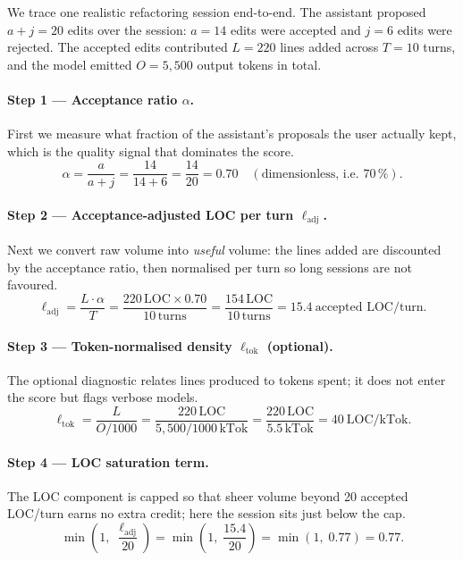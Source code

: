 \documentclass[11pt,a4paper]{article}
\begin{document}
We trace one realistic refactoring session end-to-end.  The assistant
proposed $a + j = 20$ edits over the session: $a = 14$ edits were accepted
and $j = 6$ edits were rejected.  The accepted edits contributed
$L = 220$ lines added across $T = 10$ turns, and the model emitted
$O = 5{,}500$ output tokens in total.

\paragraph{Step 1 --- Acceptance ratio $\alpha$.}
First we measure what fraction of the assistant's proposals the user
actually kept, which is the quality signal that dominates the score.
\[
  \alpha = \frac{a}{a+j}
         = \frac{14}{14+6}
         = \frac{14}{20}
         = 0.70 \quad (\text{dimensionless, i.e.\ } 70\,\%).
\]

\paragraph{Step 2 --- Acceptance-adjusted LOC per turn $\ell_{\text{adj}}$.}
Next we convert raw volume into \emph{useful} volume: the lines added are
discounted by the acceptance ratio, then normalised per turn so long
sessions are not favoured.
\[
  \ell_{\text{adj}} = \frac{L \cdot \alpha}{T}
                    = \frac{220\,\text{LOC} \times 0.70}{10\,\text{turns}}
                    = \frac{154\,\text{LOC}}{10\,\text{turns}}
                    = 15.4\ \text{accepted LOC/turn}.
\]

\paragraph{Step 3 --- Token-normalised density $\ell_{\text{tok}}$ (optional).}
The optional diagnostic relates lines produced to tokens spent; it does not
enter the score but flags verbose models.
\[
  \ell_{\text{tok}} = \frac{L}{O/1000}
                    = \frac{220\,\text{LOC}}{5{,}500/1000\,\text{kTok}}
                    = \frac{220\,\text{LOC}}{5.5\,\text{kTok}}
                    = 40\ \text{LOC/kTok}.
\]

\paragraph{Step 4 --- LOC saturation term.}
The LOC component is capped so that sheer volume beyond 20 accepted
LOC/turn earns no extra credit; here the session sits just below the cap.
\[
  \min\!\left(1,\;\frac{\ell_{\text{adj}}}{20}\right)
  = \min\!\left(1,\;\frac{15.4}{20}\right)
  = \min(1,\;0.77)
  = 0.77.
\]
\end{document}
